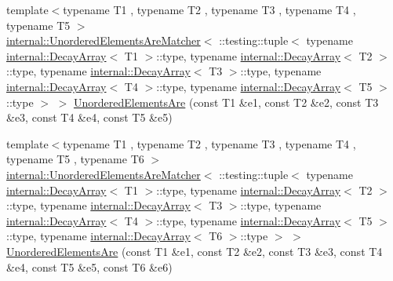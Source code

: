 \begin{DoxyCompactItemize}
\item 
{\footnotesize template$<$typename T1 , typename T2 , typename T3 , typename T4 , typename T5 $>$ }\\\hyperlink{classtesting_1_1internal_1_1UnorderedElementsAreMatcher}{internal\+::\+Unordered\+Elements\+Are\+Matcher}$<$ \+::testing\+::tuple$<$ typename \hyperlink{structtesting_1_1internal_1_1DecayArray}{internal\+::\+Decay\+Array}$<$ T1 $>$\+::type, typename \hyperlink{structtesting_1_1internal_1_1DecayArray}{internal\+::\+Decay\+Array}$<$ T2 $>$\+::type, typename \hyperlink{structtesting_1_1internal_1_1DecayArray}{internal\+::\+Decay\+Array}$<$ T3 $>$\+::type, typename \hyperlink{structtesting_1_1internal_1_1DecayArray}{internal\+::\+Decay\+Array}$<$ T4 $>$\+::type, typename \hyperlink{structtesting_1_1internal_1_1DecayArray}{internal\+::\+Decay\+Array}$<$ T5 $>$\+::type $>$ $>$ \hyperlink{namespacetesting_a5e0ff76eb3f61b6c79b60311ceca73d3}{Unordered\+Elements\+Are} (const T1 \&e1, const T2 \&e2, const T3 \&e3, const T4 \&e4, const T5 \&e5)
\item 
{\footnotesize template$<$typename T1 , typename T2 , typename T3 , typename T4 , typename T5 , typename T6 $>$ }\\\hyperlink{classtesting_1_1internal_1_1UnorderedElementsAreMatcher}{internal\+::\+Unordered\+Elements\+Are\+Matcher}$<$ \+::testing\+::tuple$<$ typename \hyperlink{structtesting_1_1internal_1_1DecayArray}{internal\+::\+Decay\+Array}$<$ T1 $>$\+::type, typename \hyperlink{structtesting_1_1internal_1_1DecayArray}{internal\+::\+Decay\+Array}$<$ T2 $>$\+::type, typename \hyperlink{structtesting_1_1internal_1_1DecayArray}{internal\+::\+Decay\+Array}$<$ T3 $>$\+::type, typename \hyperlink{structtesting_1_1internal_1_1DecayArray}{internal\+::\+Decay\+Array}$<$ T4 $>$\+::type, typename \hyperlink{structtesting_1_1internal_1_1DecayArray}{internal\+::\+Decay\+Array}$<$ T5 $>$\+::type, typename \hyperlink{structtesting_1_1internal_1_1DecayArray}{internal\+::\+Decay\+Array}$<$ T6 $>$\+::type $>$ $>$ \hyperlink{namespacetesting_aff1859501ecd94dd1bc428d146a66fdc}{Unordered\+Elements\+Are} (const T1 \&e1, const T2 \&e2, const T3 \&e3, const T4 \&e4, const T5 \&e5, const T6 \&e6)
\item 

\end{DoxyCompactItemize}
